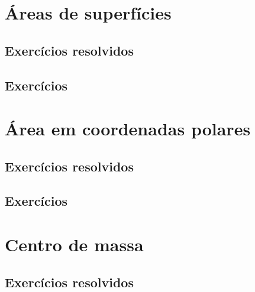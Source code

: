 \section{Áreas de superfícies}
\construirSec

\subsection*{Exercícios resolvidos}

\construirExeresol


\subsection*{Exercícios}

\construirExer






\section{Área em coordenadas polares}
\construirSec

\subsection*{Exercícios resolvidos}

\construirExeresol


\subsection*{Exercícios}

\construirExer




\section{Centro de massa}
\construirSec

\subsection*{Exercícios resolvidos}

